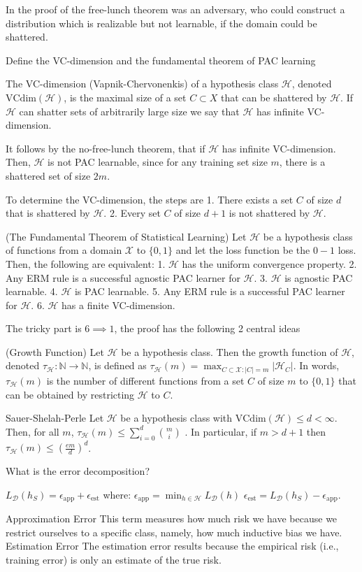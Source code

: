 \documentclass[11pt,a4paper,twoside]{article}
\begin{document}
In the proof of the free-lunch theorem was an adversary, who could construct a distribution which is realizable but not learnable,
if the domain could be shattered.


Define the VC-dimension and the fundamental theorem of PAC learning

The VC-dimension (Vapnik-Chervonenkis) of a hypothesis class \( \mathcal{H} \), denoted \( \text{VCdim}(\mathcal{H}) \), 
is the maximal size of a set \( C \subset X \) that can be shattered by \( \mathcal{H} \). 
If \( \mathcal{H} \) can shatter sets of arbitrarily large size we say that \( \mathcal{H} \) has infinite
VC-dimension.

It follows by the no-free-lunch theorem, that if \( \mathcal{H} \) has infinite VC-dimension. Then, \( \mathcal{H} \) is not PAC
learnable, since for any training set size \( m \), there is a shattered set of size \( 2m \).

To determine the VC-dimension, the steps are
1. There exists a set \( C \) of size \( d \) that is shattered by \( \mathcal{H} \).
2. Every set \( C \) of size \( d+1 \) is not shattered by \( \mathcal{H} \).

(The Fundamental Theorem of Statistical Learning) 
Let \(\mathcal{H}\) be a hypothesis class of functions from a domain \(\mathcal{X}\) to \(\{0,1\}\) and 
let the loss function be the \(0 - 1\) loss. Then, the following are equivalent:
1. \(\mathcal{H}\) has the uniform convergence property.
2. Any ERM rule is a successful agnostic PAC learner for \(\mathcal{H}\).
3. \(\mathcal{H}\) is agnostic PAC learnable.
4. \(\mathcal{H}\) is PAC learnable.
5. Any ERM rule is a successful PAC learner for \(\mathcal{H}\).
6. \(\mathcal{H}\) has a finite VC-dimension.

The tricky part is \( 6 \implies 1 \), the proof has the following 2 central ideas

(Growth Function) 
Let \(\mathcal{H}\) be a hypothesis class. 
Then the growth function of \(\mathcal{H}\), denoted \(\tau_{\mathcal{H}} : \mathbb{N} \to \mathbb{N}\), is defined as 
\(\tau_{\mathcal{H}}(m) = \max_{C \subset \mathcal{X}: |C|=m} |\mathcal{H}_C|.\)
In words, \(\tau_{\mathcal{H}}(m)\) is the number of different functions from a set \(C\) of size \(m\) to \(\{0,1\}\) 
that can be obtained by restricting \(\mathcal{H}\) to \(C\).

Sauer-Shelah-Perle
Let \( \mathcal{H} \) be a hypothesis class with \( \text{VCdim}(\mathcal{H}) \leq d < \infty \). 
Then, for all \( m \), \(\tau_{\mathcal{H}}(m) \leq \sum_{i=0}^d \binom{m}{i}\) . 
In particular, if \( m > d + 1 \) then \( \tau_{\mathcal{H}}(m) \leq (\frac{em}{d})^d \).


What is the error decomposition?

\(L_{\mathcal{D}}(h_S) = \epsilon_{\text{app}} + \epsilon_{\text{est}}\)
where: \(\epsilon_{\text{app}} = \min_{h \in \mathcal{H}} L_{\mathcal{D}}(h)\) 
\(\epsilon_{\text{est}} = L_{\mathcal{D}}(h_S) - \epsilon_{\text{app}}.\)

Approximation Error
This term measures how much risk we have because
we restrict ourselves to a specific class, namely, how much inductive bias we
have.
Estimation Error
The estimation error results
because the empirical risk (i.e., training error) is only an estimate of the
true risk.
\end{document}
